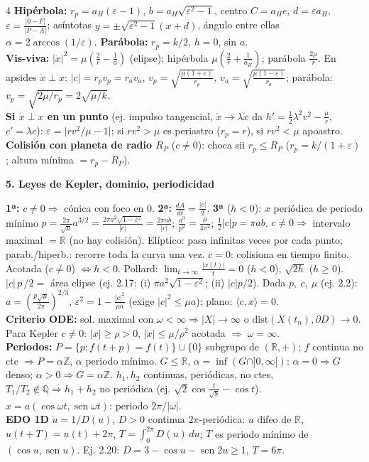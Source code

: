 \documentclass[8pt,a4paper,landscape]{extarticle}
\newcommand{\ip}[2]{\langle #1,#2\rangle}
\newcommand{\ab}[1]{\lvert #1\rvert}
\newcommand{\xd}{\dot x}
\newcommand{\xdd}{\ddot x}
\newcommand{\R}{\mathbb{R}}
\newcommand{\rper}{r_{p}}
\newcommand{\rapo}{r_{a}}
\DeclareMathOperator{\sen}{sen}
\newcommand{\seccion}[1]{\par\vspace{1.5pt}\noindent\colorbox{blue!12}{\parbox{\dimexpr\linewidth-2\fboxsep\relax}{\textbf{\textcolor{NavyBlue}{#1}}}}\par\vspace{0.5pt}}
\begin{document}
\begin{multicols}{4}
\textbf{Hipérbola:} $\rper=a_H(\varepsilon-1)$, $b=a_H\sqrt{\varepsilon^2-1}$, centro $C=a_He$, $d=\varepsilon a_H$, $\varepsilon=\frac{\ab{0-F}}{\ab{P-A}}$; asíntotas $y=\pm\sqrt{\varepsilon^2-1}(x+d)$, ángulo entre ellas $\alpha=2\arccos(1/\varepsilon)$.
\textbf{Parábola:} $\rper=k/2$, $h=0$, sin $a$.\\
\textbf{Vis-viva:} $\ab\xd^2=\mu(\frac2r-\frac1a)$ (elipse); hipérbola $\mu(\frac2r+\frac1{a_H})$; parábola $\frac{2\mu}r$. En apsides $\xd\perp x$: $\ab c=\rper v_p=\rapo v_a$, $v_p=\sqrt{\frac{\mu(1+\varepsilon)}{\rper}}$, $v_a=\sqrt{\frac{\mu(1-\varepsilon)}{\rapo}}$; parábola: $v_p=\sqrt{2\mu/\rper}=2\sqrt{\mu/k}$.\\
\textbf{Si $\xd\perp x$ en un punto} (ej. impulso tangencial, $\xd\to\lambda\xd$ da $h'=\frac12\lambda^2v^2-\frac\mu r$, $c'=\lambda c$): $\varepsilon=\ab{rv^2/\mu-1}$; si $rv^2>\mu$ es periastro ($\rper=r$), si $rv^2<\mu$ apoastro.\\
\textbf{Colisión con planeta de radio $R_P$} ($c\ne0$): choca sii $\rper\le R_P$ ($\rper=k/(1+\varepsilon)$; altura mínima $=\rper-R_P$).

\seccion{5. Leyes de Kepler, dominio, periodicidad}
\textbf{1ª:} $c\ne0\Rightarrow$ cónica con foco en 0. \textbf{2ª:} $\frac{dA}{dt}=\frac{\ab c}2$. \textbf{3ª} ($h<0$): $x$ periódica de periodo mínimo
$\boxed{p=\frac{2\pi}{\sqrt\mu}a^{3/2}}=\frac{2\pi a^2\sqrt{1-\varepsilon^2}}{\ab c}=\frac{2\pi ab}{\ab c}$; $\frac{a^3}{p^2}=\frac{\mu}{4\pi^2}$; $\frac12\ab cp=\pi ab$.
$c\ne0\Rightarrow$ intervalo maximal $=\R$ (no hay colisión). Elíptico: pasa infinitas veces por cada punto; parab./hiperb.: recorre toda la curva una vez. $c=0$: colisiona en tiempo finito. Acotada ($c\ne0$) $\iff h<0$.
Pollard: $\lim_{t\to\infty}\frac{\ab{x(t)}}{t}=0$ ($h<0$), $\sqrt{2h}$ ($h\ge0$).
$\ab c\,p\,/2=$ área elipse (ej. 2.17: (i) $\pi a^2\sqrt{1-\varepsilon^2}$; (ii) $\ab cp/2$).
Dada $p,\ c,\ \mu$ (ej. 2.2): $a=(\frac{p\sqrt\mu}{2\pi})^{2/3}$, $\varepsilon^2=1-\frac{\ab c^2}{\mu a}$ (exige $\ab c^2\le\mu a$); plano: $\ip cx=0$.\\
\textbf{Criterio ODE:} sol. maximal con $\omega<\infty\Rightarrow\ab{X}\to\infty$ o $\mathrm{dist}(X(t_n),\partial D)\to0$. Para Kepler $c\ne0$: $\ab x\ge\rho>0$, $\ab\xdd\le\mu/\rho^2$ acotada $\Rightarrow$ $\omega=\infty$.\\
\textbf{Periodos:} $P=\{p:f(t+p)=f(t)\}\cup\{0\}$ subgrupo de $(\R,+)$; $f$ continua no cte $\Rightarrow P=\alpha\mathbb Z$, $\alpha$ periodo mínimo. $G\le\R$, $\alpha=\inf(G\cap]0,\infty[)$: $\alpha=0\Rightarrow G$ denso; $\alpha>0\Rightarrow G=\alpha\mathbb Z$. $h_1,h_2$ continuas, periódicas, no ctes, $T_1/T_2\notin\mathbb Q\Rightarrow h_1+h_2$ no periódica (ej. $\sqrt2\cos\frac t{\sqrt8}-\cos t$). $x=a(\cos\omega t,\sen\omega t)$: periodo $2\pi/\ab\omega$.\\
\textbf{EDO 1D} $\dot u=1/D(u)$, $D>0$ continua $2\pi$-periódica: $u$ difeo de $\R$, $u(t+T)=u(t)+2\pi$, $T=\int_0^{2\pi}D(u)\,du$; $T$ es periodo mínimo de $(\cos u,\sen u)$. Ej. 2.20: $D=3-\cos u-\sen2u\ge1$, $T=6\pi$.


\end{multicols}
\end{document}
